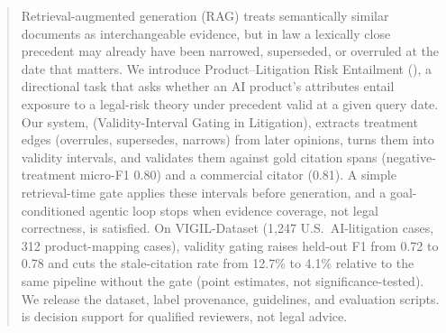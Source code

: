 \begin{abstract}
Retrieval-augmented generation (RAG) treats semantically similar documents as interchangeable evidence, but in law a lexically close precedent may already have been narrowed, superseded, or overruled at the date that matters.
We introduce Product--Litigation Risk Entailment (\plre), a directional task that asks whether an AI product's attributes entail exposure to a legal-risk theory under precedent valid at a given query date.
Our system, \sysname{} (Validity-Interval Gating in Litigation), extracts treatment edges (overrules, supersedes, narrows) from later opinions, turns them into validity intervals, and validates them against gold citation spans (negative-treatment micro-F1 0.80) and a commercial citator (0.81).
A simple retrieval-time gate applies these intervals before generation, and a goal-conditioned agentic loop stops when evidence coverage, not legal correctness, is satisfied.
On VIGIL-Dataset (1{,}247 U.S.\ AI-litigation cases, 312 product-mapping cases), validity gating raises held-out \plre{} F1 from 0.72 to 0.78 and cuts the stale-citation rate from 12.7\% to 4.1\% relative to the same pipeline without the gate (point estimates, not significance-tested).
We release the dataset, label provenance, guidelines, and evaluation scripts.
\sysname{} is decision support for qualified reviewers, not legal advice.
\end{abstract}
